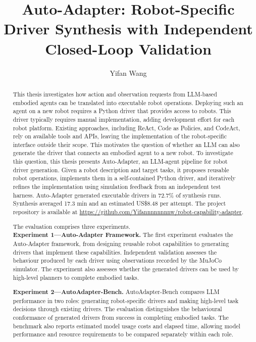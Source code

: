 \makeatletter
\renewcommand {\@degree@string} {Master of Science}
\makeatother

\title{Auto-Adapter: Robot-Specific Driver Synthesis with Independent Closed-Loop Validation}
\author{Yifan Wang}

\maketitle
\makedeclaration

\begin{abstract}
This thesis investigates how action and observation requests from LLM-based embodied agents can be translated into executable robot operations. Deploying such an agent on a new robot requires a Python driver that provides access to robots. This driver typically requires manual implementation, adding development effort for each robot platform. Existing approaches, including ReAct, Code as Policies, and CodeAct, rely on available tools and APIs, leaving the implementation of the robot-specific interface outside their scope. This motivates the question of whether an LLM can also generate the driver that connects an embodied agent to a new robot.
To investigate this question, this thesis presents Auto-Adapter, an LLM-agent pipeline for robot driver generation. Given a robot description and target tasks, it proposes reusable robot operations, implements them in a self-contained Python driver, and iteratively refines the implementation using simulation feedback from an independent test harness. Auto-Adapter generated executable drivers in 72.7\% of synthesis runs.
Synthesis averaged 17.3 min and an estimated US\$8.48 per attempt.
The project repository
is available at \url{https://github.com/Yifannnnnnnnw/robot-capability-adapter}.

The evaluation comprises three experiments.\\
\textbf{Experiment 1---Auto-Adapter Framework.}
The first experiment evaluates the Auto-Adapter framework, from designing
reusable robot capabilities to generating drivers that implement these
capabilities. Independent validation assesses the behaviour produced by each
driver using observations recorded by the MuJoCo simulator. The experiment
also assesses whether the generated drivers can be used by high-level
planners to complete embodied tasks.

\textbf{Experiment 2---AutoAdapter-Bench.} AutoAdapter-Bench compares LLM
performance in two roles: generating robot-specific drivers and making
high-level task decisions through existing drivers. The evaluation
distinguishes the behavioural conformance of generated drivers from success
in completing embodied tasks. The benchmark also reports estimated model
usage costs and elapsed time, allowing model performance and resource
requirements to be compared separately within each role.


\end{abstract}
